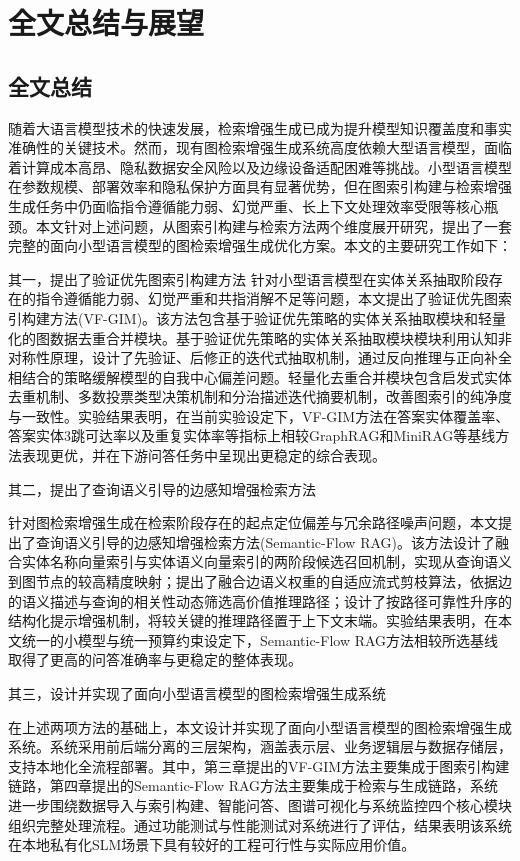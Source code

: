 \documentclass[promaster, vlined]{DissertUESTC}
\begin{document}
\chapter{全文总结与展望}

\section{全文总结}

随着大语言模型技术的快速发展，检索增强生成已成为提升模型知识覆盖度和事实准确性的关键技术。然而，现有图检索增强生成系统高度依赖大型语言模型，面临着计算成本高昂、隐私数据安全风险以及边缘设备适配困难等挑战。小型语言模型在参数规模、部署效率和隐私保护方面具有显著优势，但在图索引构建与检索增强生成任务中仍面临指令遵循能力弱、幻觉严重、长上下文处理效率受限等核心瓶颈。本文针对上述问题，从图索引构建与检索方法两个维度展开研究，提出了一套完整的面向小型语言模型的图检索增强生成优化方案。本文的主要研究工作如下：

其一，提出了验证优先图索引构建方法
针对小型语言模型在实体关系抽取阶段存在的指令遵循能力弱、幻觉严重和共指消解不足等问题，本文提出了验证优先图索引构建方法(VF-GIM)。该方法包含基于验证优先策略的实体关系抽取模块和轻量化的图数据去重合并模块。基于验证优先策略的实体关系抽取模块模块利用认知非对称性原理，设计了先验证、后修正的迭代式抽取机制，通过反向推理与正向补全相结合的策略缓解模型的自我中心偏差问题。轻量化去重合并模块包含启发式实体去重机制、多数投票类型决策机制和分治描述迭代摘要机制，改善图索引的纯净度与一致性。实验结果表明，在当前实验设定下，VF-GIM方法在答案实体覆盖率、答案实体3跳可达率以及重复实体率等指标上相较GraphRAG和MiniRAG等基线方法表现更优，并在下游问答任务中呈现出更稳定的综合表现。

其二，提出了查询语义引导的边感知增强检索方法

针对图检索增强生成在检索阶段存在的起点定位偏差与冗余路径噪声问题，本文提出了查询语义引导的边感知增强检索方法(Semantic-Flow RAG)。该方法设计了融合实体名称向量索引与实体语义向量索引的两阶段候选召回机制，实现从查询语义到图节点的较高精度映射；提出了融合边语义权重的自适应流式剪枝算法，依据边的语义描述与查询的相关性动态筛选高价值推理路径；设计了按路径可靠性升序的结构化提示增强机制，将较关键的推理路径置于上下文末端。实验结果表明，在本文统一的小模型与统一预算约束设定下，Semantic-Flow RAG方法相较所选基线取得了更高的问答准确率与更稳定的整体表现。

其三，设计并实现了面向小型语言模型的图检索增强生成系统

在上述两项方法的基础上，本文设计并实现了面向小型语言模型的图检索增强生成系统。系统采用前后端分离的三层架构，涵盖表示层、业务逻辑层与数据存储层，支持本地化全流程部署。其中，第三章提出的VF-GIM方法主要集成于图索引构建链路，第四章提出的Semantic-Flow RAG方法主要集成于检索与生成链路，系统进一步围绕数据导入与索引构建、智能问答、图谱可视化与系统监控四个核心模块组织完整处理流程。通过功能测试与性能测试对系统进行了评估，结果表明该系统在本地私有化SLM场景下具有较好的工程可行性与实际应用价值。
\end{document}
